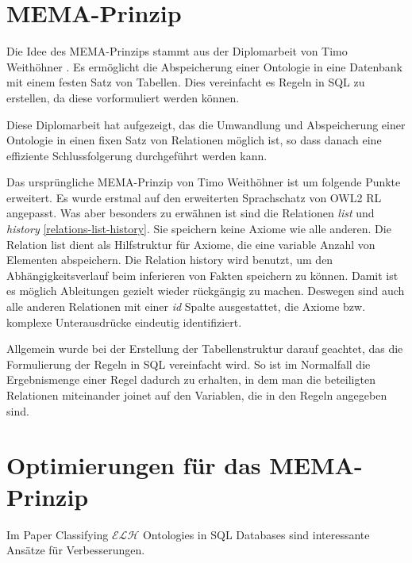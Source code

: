 \section{MEMA-Prinzip}
Die Idee des MEMA-Prinzips stammt aus der Diplomarbeit von Timo Weithöhner \cite{Weithoehner}. Es ermöglicht die Abspeicherung einer Ontologie in eine Datenbank mit einem festen Satz von Tabellen. Dies vereinfacht es Regeln in SQL zu erstellen, da diese vorformuliert werden können.

Diese Diplomarbeit hat aufgezeigt, das die Umwandlung und Abspeicherung einer Ontologie in einen fixen Satz von Relationen möglich ist, so dass danach eine effiziente Schlussfolgerung durchgeführt werden kann.

Das ursprüngliche MEMA-Prinzip von Timo Weithöhner ist um folgende Punkte erweitert.
Es wurde erstmal auf den erweiterten Sprachschatz von OWL2 RL angepasst. Was aber besonders zu erwähnen ist sind die Relationen \emph{list} und \emph{history} \ref{relations-list-history}. Sie speichern keine Axiome wie alle anderen. Die Relation list dient als Hilfstruktur für Axiome, die eine variable Anzahl von Elementen abspeichern. Die Relation history wird benutzt, um den Abhängigkeitsverlauf beim inferieren von Fakten speichern zu können. Damit ist es möglich Ableitungen gezielt wieder rückgängig zu machen. Deswegen sind auch alle anderen Relationen mit einer \emph{id} Spalte ausgestattet, die Axiome bzw. komplexe Unterausdrücke eindeutig identifiziert.

Allgemein wurde bei der Erstellung der Tabellenstruktur darauf geachtet, das die Formulierung der Regeln in SQL vereinfacht wird. So ist im Normalfall die Ergebnismenge einer Regel dadurch zu erhalten, in dem man die beteiligten Relationen miteinander joinet auf den Variablen, die in den Regeln angegeben sind.



\section{Optimierungen für das MEMA-Prinzip}

Im Paper Classifying $\mathcal{ELH}$ Ontologies in SQL Databases \cite{Delaitre2009} sind interessante Ansätze für Verbesserungen.

